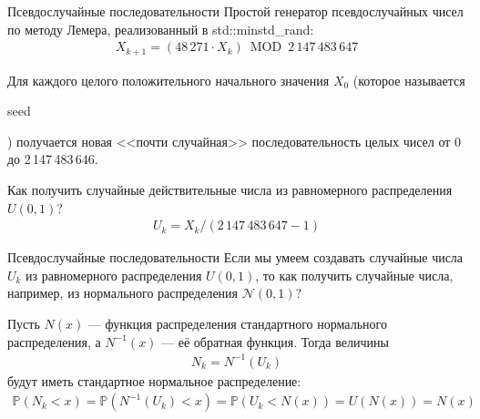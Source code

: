 \documentclass{beamer}
\newcommand{\en}[1]{\begin{otherlanguage}{english}#1\end{otherlanguage}}
\begin{document}
\begin{frame}{Псевдослучайные последовательности}
\justify
Простой генератор псевдослучайных чисел по методу Лемера, реализованный в std::minstd\_rand:
\begin{align*}
X_{k+1} = (48\,271 \cdot X_k) \ \operatorname{MOD} \ 2\,147\,483\,647
\end{align*}

\justify
Для каждого целого положительного начального значения $X_0$ (которое называется \en{seed}) получается новая <<почти случайная>> последовательность целых чисел от 0 до 2\,147\,483\,646.

\justify
Как получить случайные действительные числа из равномерного распределения $U(0, 1)$?
\begin{align*}
U_k = X_k / (2\,147\,483\,647 - 1)
\end{align*}
\end{frame}



\begin{frame}{Псевдослучайные последовательности}
\justify
Если мы умеем создавать случайные числа $U_k$ из равномерного распределения $U(0,1)$, то как получить случайные числа, например, из нормального распределения $\mathcal{N}(0, 1)$?

\justify
Пусть $N(x)$ --- функция распределения стандартного нормального распределения, а $N^{-1}(x)$ --- её обратная функция. Тогда величины
\begin{align*}
N_k = N^{-1}(U_k)
\end{align*}
будут иметь стандартное нормальное распределение:
\begin{align*}
\mathbb{P}(N_k < x) = \mathbb{P}(N^{-1}(U_k) < x) = \mathbb{P}(U_k < N(x)) = U(N(x)) = N(x)
\end{align*}
\end{frame}
\end{document}
